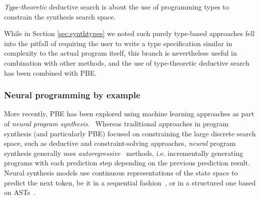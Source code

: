 \documentclass{article}
\begin{document}

\emph{Type-theoretic} deductive search is about the use of programming
types to constrain the synthesis search space.


While in Section \ref{sec:synthtypes} we noted such purely type-based
approaches fell into the pitfall of requiring the user to write a
type specification similar in complexity to the actual program itself,
this branch is nevertheless useful in combination with other methods,
and the use of type-theoretic deductive search has been combined with PBE.~\citep{myth}


\subsubsection{Neural programming by example} \label{sec:neuralpbe}

More recently, PBE has been explored using machine learning approaches as part of \emph{neural program synthesis}.~\citep{nps}
Whereas traditional approaches in program synthesis (and particularly PBE) focused on constraining the large discrete search space,
such as deductive and constraint-solving approaches,
\emph{neural} program synthesis generally uses \emph{autoregressive}~\citep{kendall1944autoregressive} methods,
i.e. incrementally generating programs with each prediction step depending on the previous prediction result.
Neural synthesis models use continuous representations of the state space to predict the next token,
be it in a sequential fashion~\citep{npi,neuralmachinetranslation,alphanpi},
or in a structured one based on ASTs~\citep{nsps}.
\end{document}
